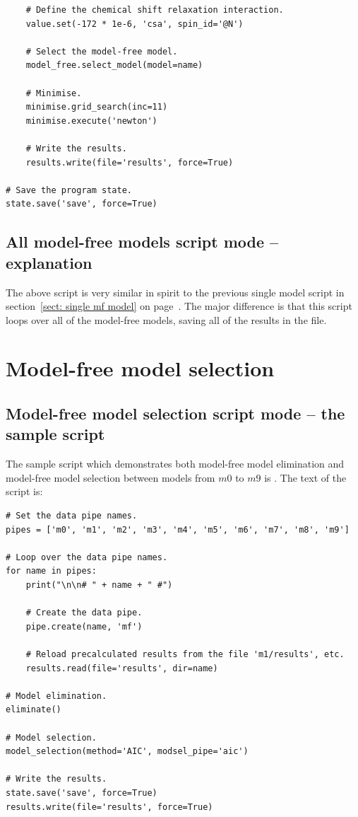 \begin{lstlisting}
    # Define the chemical shift relaxation interaction.
    value.set(-172 * 1e-6, 'csa', spin_id='@N')
    
    # Select the model-free model.
    model_free.select_model(model=name)
    
    # Minimise.
    minimise.grid_search(inc=11)
    minimise.execute('newton')
    
    # Write the results.
    results.write(file='results', force=True)

# Save the program state.
state.save('save', force=True)
\end{lstlisting}



\subsection{All model-free models script mode -- explanation}

The above script is very similar in spirit to the previous single model script in section~\ref{sect: single mf model} on page~\pageref{sect: single mf model}.
The major difference is that this script loops over all of the model-free models, saving all of the results in the  file.




\section{Model-free model selection}



\subsection{Model-free model selection script mode -- the sample script}

The sample script which demonstrates both model-free model elimination and model-free model selection between models from $m0$ to $m9$ is .
The text of the script is:

\begin{lstlisting}
# Set the data pipe names.
pipes = ['m0', 'm1', 'm2', 'm3', 'm4', 'm5', 'm6', 'm7', 'm8', 'm9']

# Loop over the data pipe names.
for name in pipes:
    print("\n\n# " + name + " #")
    
    # Create the data pipe.
    pipe.create(name, 'mf')
    
    # Reload precalculated results from the file 'm1/results', etc.
    results.read(file='results', dir=name)

# Model elimination.
eliminate()

# Model selection.
model_selection(method='AIC', modsel_pipe='aic')

# Write the results.
state.save('save', force=True)
results.write(file='results', force=True)
\end{lstlisting}



